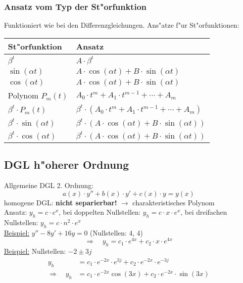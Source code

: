 \subsubsection{Ansatz vom Typ der St"orfunktion}
Funktioniert wie bei den Differenzgleichungen. Ans"atze f"ur St"orfunktionen:\newline\newline
\begin{center}
\begin{tabular}{|p{3cm}|p{6cm}|}
\hline
St"orfunktion & Ansatz \\
\hline
$\beta^t$ & $A\cdot\beta^t$ \\
$\sin(\alpha t)$ & $A\cdot\cos(\alpha t) + B\cdot\sin(\alpha t)$ \\
$\cos(\alpha t)$ & $A\cdot\cos(\alpha t) + B\cdot\sin(\alpha t)$ \\
Polynom $P_m(t)$ & $A_0\cdot t^m+A_1\cdot t^{m-1} + \cdots + A_m$ \\
$\beta^t\cdot P_m(t)$ & $\beta^t\cdot\left({A_0\cdot t^m + A_1\cdot t^{m-1}+\cdots+A_m}\right)$ \\
$\beta^t\cdot\sin(\alpha t)$ & $\beta^t\cdot\left({A\cdot\cos(\alpha t)+B\cdot\sin(\alpha t)}\right)$ \\
$\beta^t\cdot\cos(\alpha t)$ & $\beta^t\cdot\left({A\cdot\cos(\alpha t)+B\cdot\sin(\alpha t)}\right)$ \\
\hline
\end{tabular}
\end{center}

\subsection{DGL h"oherer Ordnung}
Allgemeine DGL 2. Ordnung:
\begin{equation}
	a(x)\cdot y''+b(x)\cdot y'+c(x)\cdot y = y(x)
\end{equation}
\newline
homogene DGL: \textbf{nicht separierbar!} $\longrightarrow$ charakteristisches Polynom \\
Ansatz: $y_h=c\cdot e^x$, bei doppelten Nullstellen: $y_h=c\cdot x\cdot e^x$, bei dreifachen Nullstellen: 
$y_h=c\cdot n^2\cdot e^x$ \\
\newline
\underline{Beispiel:} $y''-8y'+16y=0$ (Nullstellen: $4$, $4$)
\begin{equation*}
	\Longrightarrow\quad y_h=c_1\cdot e^{4x}+c_2\cdot x\cdot e^{4x}
\end{equation*}
\newline
\underline{Beispiel:} Nullstellen: $-2\pm 3j$
\begin{align*}
	y_h &=c_1\cdot e^{-2x}\cdot e^{3j}+c_2\cdot e^{-2x}\cdot e^{-3j} \\
	\Longrightarrow\quad
	y_h &= c_1\cdot e^{-2x}\cos(3x)+c_2\cdot e^{-2x}\cdot\sin(3x)
\end{align*}

